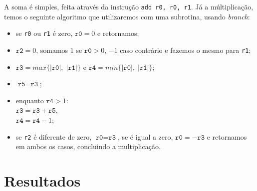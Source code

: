 \documentclass[brazilian,a4paper,twocolumn]{article}
\begin{document}

    A soma é simples, feita através da instrução \texttt{add r0, r0, r1}. Já a múltiplicação, temos o seguinte algoritmo que utilizaremos com uma subrotina, usando \textit{branch}:
    \begin{itemize}
        \item se \texttt{r0} ou \texttt{r1} é zero, $ \texttt{r0} = 0 $ e retornamos;
        \item $ \texttt{r2} = 0 $, somamos $1$ se $ \texttt{r0} > 0$, $-1$ caso contrário e fazemos o mesmo para \texttt{r1};
        \item $ \texttt{r3} = max\{ |\texttt{r0}| , \; |\texttt{r1}| \} $ e $ \texttt{r4} = min\{ |\texttt{r0}| , \; |\texttt{r1}| \} $;
        \item $ \texttt{r5} = \texttt{r3} $;
        \item enquanto $ \texttt{r4} > 1 $:\\
            $ \texttt{r3} = \texttt{r3} + \texttt{r5} $,\\
            $ \texttt{r4} = \texttt{r4} - 1 $;
        \item se \texttt{r2} é diferente de zero, $ \texttt{r0} = \texttt{r3} $, se é igual a zero, $ \texttt{r0} =  - \texttt{r3} $ e retornamos em ambos os casos, concluindo a multiplicação.
    \end{itemize}

\section{Resultados}
\end{document}
